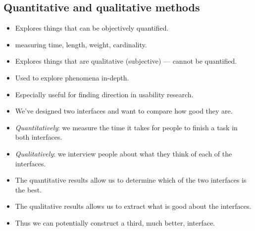 \subsection{Quantitative and qualitative methods}

\begin{frame}
  \begin{definition}
    \begin{itemize}
      \item Explores things that can be objectively quantified.
      \item \Eg measuring time, length, weight, cardinality.
    \end{itemize}
  \end{definition}

  \begin{definition}
    \begin{itemize}
      \item Explores things that are qualitative (subjective) --- cannot be 
        quantified.
      \item Used to explore phenomena in-depth.
      \item Especially useful for finding direction in usability research.
    \end{itemize}
  \end{definition}
\end{frame}

\begin{frame}
  \begin{example}
    \begin{itemize}
      \item We've designed two interfaces and want to compare how good they 
        are.

      \item \emph{Quantitatively}: we measure the time it takes for people to 
        finish a task in both interfaces.

      \item \emph{Qualitatively}: we interview people about what they think of 
        each of the interfaces.
    \end{itemize}
  \end{example}
\end{frame}

\begin{frame}
  \begin{remark}
    \begin{itemize}
      \item The quantitative results allow us to determine which of the two 
        interfaces is the best.

      \item The qualitative results allows us to extract what is good about the 
        interfaces.

      \item Thus we can potentially construct a third, much better, interface.
    \end{itemize}
  \end{remark}
\end{frame}




\begin{frame}[allowframebreaks]
  \small
  \printbibliography
\end{frame}

